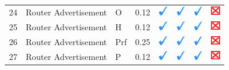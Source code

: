 \documentclass[12pt]{article}
\begin{document}
\begin{savenotes}
\begin{table}[!h]
{{\begin{tabular}{|C{1.0cm}|L{5.0cm}|L{5.0cm}|C{2.0cm}|C{1.0cm}|C{1.0cm}|C{1.0cm}|C{1.0cm}|}
24&Router Advertisement&O&0.12&\includegraphics[width=4mm, height=4mm]{ok}&\includegraphics[width=4mm, height=4mm]{ok}&\includegraphics[width=4mm, height=4mm]{ok}&\includegraphics[width=4mm, height=4mm]{notok}\\
25&Router Advertisement&H&0.12&\includegraphics[width=4mm, height=4mm]{ok}&\includegraphics[width=4mm, height=4mm]{ok}&\includegraphics[width=4mm, height=4mm]{ok}&\includegraphics[width=4mm, height=4mm]{notok}\\
26&Router Advertisement&Prf&0.25&\includegraphics[width=4mm, height=4mm]{ok}&\includegraphics[width=4mm, height=4mm]{ok}&\includegraphics[width=4mm, height=4mm]{ok}&\includegraphics[width=4mm, height=4mm]{notok}\\
27&Router Advertisement&P&0.12&\includegraphics[width=4mm, height=4mm]{ok}&\includegraphics[width=4mm, height=4mm]{ok}&\includegraphics[width=4mm, height=4mm]{ok}&\includegraphics[width=4mm, height=4mm]{notok}\\

\end{tabular}}}
\end{table}
\end{savenotes}
\end{document}
